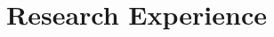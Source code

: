 \documentclass[10pt]{article} %
\begin{document}
\begin{tabularx}{\linewidth}{@{}lR@{}}
\end{tabularx}


%


\section{Research Experience}
\end{document}
